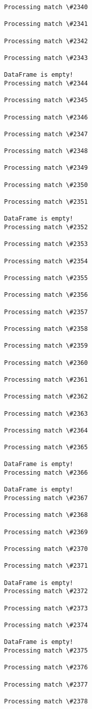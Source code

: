 \documentclass[11pt]{article}
\begin{document}
\begin{Verbatim}[commandchars=\\\{\}]
Processing match \#2340

Processing match \#2341

Processing match \#2342

Processing match \#2343

DataFrame is empty!
Processing match \#2344

Processing match \#2345

Processing match \#2346

Processing match \#2347

Processing match \#2348

Processing match \#2349

Processing match \#2350

Processing match \#2351

DataFrame is empty!
Processing match \#2352

Processing match \#2353

Processing match \#2354

Processing match \#2355

Processing match \#2356

Processing match \#2357

Processing match \#2358

Processing match \#2359

Processing match \#2360

Processing match \#2361

Processing match \#2362

Processing match \#2363

Processing match \#2364

Processing match \#2365

DataFrame is empty!
Processing match \#2366

DataFrame is empty!
Processing match \#2367

Processing match \#2368

Processing match \#2369

Processing match \#2370

Processing match \#2371

DataFrame is empty!
Processing match \#2372

Processing match \#2373

Processing match \#2374

DataFrame is empty!
Processing match \#2375

Processing match \#2376

Processing match \#2377

Processing match \#2378


\end{Verbatim}
\end{document}
